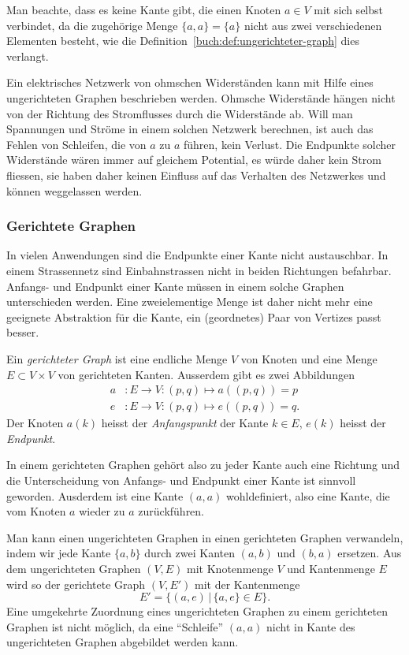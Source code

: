 Man beachte, dass es keine Kante gibt, die einen Knoten $a\in V$
mit sich selbst verbindet, da die zugehörige Menge $\{a,a\}=\{a\}$
nicht aus zwei verschiedenen Elementen besteht, wie die
Definition~\ref{buch:def:ungerichteter-graph} dies verlangt.

Ein elektrisches Netzwerk von ohmschen Widerständen kann mit Hilfe
eines ungerichteten Graphen beschrieben werden.
Ohmsche Widerstände hängen nicht von der Richtung des Stromflusses
durch die Widerstände ab.
Will man Spannungen und Ströme in einem solchen Netzwerk berechnen,
ist auch das Fehlen von Schleifen, die von $a$ zu $a$ führen, kein
Verlust.
Die Endpunkte solcher Widerstände wären immer auf gleichem Potential,
es würde daher kein Strom fliessen, sie haben daher keinen Einfluss auf
das Verhalten des Netzwerkes und können weggelassen werden.

\subsubsection{Gerichtete Graphen}
In vielen Anwendungen sind die Endpunkte einer Kante nicht austauschbar.
In einem Strassennetz sind Einbahnstrassen nicht in beiden Richtungen
befahrbar.
Anfangs- und Endpunkt einer Kante müssen in einem solche Graphen
unterschieden werden.
Eine zweielementige Menge ist daher nicht mehr eine geeignete Abstraktion
für die Kante, ein (geordnetes) Paar von Vertizes passt besser.

\begin{definition}
\label{buch:def:gerichteter-graph}
%
%
Ein {\em gerichteter Graph} ist eine endliche Menge $V$ von Knoten
und eine Menge $E \subset V\times V$ von gerichteten Kanten.
Ausserdem gibt es zwei Abbildungen
\[
\begin{aligned}
a&\colon E\to V: (p,q) \mapsto a((p,q)) = p
\\
e&\colon E\to V: (p,q) \mapsto e((p,q)) = q.
\end{aligned}
\]
Der Knoten $a(k)$ heisst der {\em Anfangspunkt} der Kante $k\in E$,
$e(k)$ heisst der {\em Endpunkt}.
\end{definition}

In einem gerichteten Graphen gehört also zu jeder Kante auch eine Richtung
und die Unterscheidung von Anfangs- und Endpunkt einer Kante ist sinnvoll
geworden.
Ausderdem ist eine Kante $(a,a)$ wohldefiniert, also eine Kante, die vom
Knoten $a$ wieder zu $a$ zurückführen.

Man kann einen ungerichteten Graphen in einen gerichteten Graphen
verwandeln, indem wir jede Kante $\{a,b\}$ durch zwei Kanten 
$(a,b)$ und $(b,a)$ ersetzen.
Aus dem ungerichteten Graphen $(V,E)$ mit Knotenmenge $V$ und Kantenmenge
$E$ wird so der gerichtete Graph
$(V,E')$ mit der Kantenmenge
\begin{equation*}
E' 
=
\{
(a,e)
\,|\,
\{a,e\}\in E
\}.
\end{equation*}
Eine umgekehrte Zuordnung eines ungerichteten Graphen zu einem gerichteten
Graphen ist nicht möglich, da eine ``Schleife'' $(a,a)$ nicht in Kante
des ungerichteten Graphen abgebildet werden kann.

